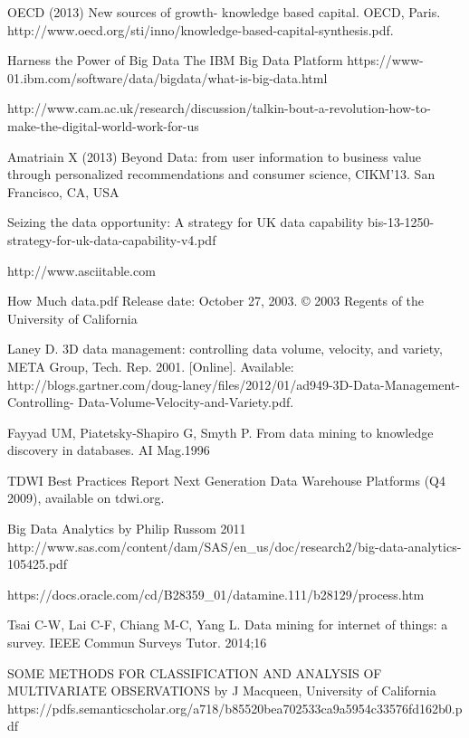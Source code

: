 \documentclass[10pt,journal,compsoc]{IEEEtran}
\begin{document}
\begin{thebibliography}{1}

OECD (2013) New sources of growth- knowledge based capital. OECD, Paris. 
http://www.oecd.org/sti/inno/knowledge-based-capital-synthesis.pdf.

Harness the Power of Big Data The IBM Big Data Platform
https://www-01.ibm.com/software/data/bigdata/what-is-big-data.html

http://www.cam.ac.uk/research/discussion/talkin-bout-a-revolution-how-to-make-the-digital-world-work-for-us

Amatriain X (2013) Beyond Data: from user information to business value through personalized recommendations
and consumer science, CIKM’13. San Francisco, CA, USA

Seizing the data opportunity: A strategy for UK data capability
bis-13-1250-strategy-for-uk-data-capability-v4.pdf

http://www.asciitable.com

How Much data.pdf
Release date: October 27, 2003. © 2003 Regents of the University of California

Laney D. 3D data management: controlling data volume, velocity, and variety, META Group, Tech. Rep. 2001.
[Online]. Available: http://blogs.gartner.com/doug-laney/files/2012/01/ad949-3D-Data-Management-Controlling-
Data-Volume-Velocity-and-Variety.pdf.

Fayyad UM, Piatetsky-Shapiro G, Smyth P. From data mining to knowledge discovery in databases. AI Mag.1996

TDWI Best Practices Report Next Generation Data Warehouse Platforms (Q4 2009), available on tdwi.org.

Big Data Analytics by Philip Russom 2011
http://www.sas.com/content/dam/SAS/en\_us/doc/research2/big-data-analytics-105425.pdf

https://docs.oracle.com/cd/B28359\_01/datamine.111/b28129/process.htm

Tsai C-W, Lai C-F, Chiang M-C, Yang L. Data mining for internet of things: a survey. IEEE Commun Surveys Tutor.
2014;16

SOME METHODS FOR CLASSIFICATION AND ANALYSIS OF MULTIVARIATE OBSERVATIONS by J Macqueen, University of California
https://pdfs.semanticscholar.org/a718/b85520bea702533ca9a5954c33576fd162b0.pdf


\end{thebibliography}
\end{document}
